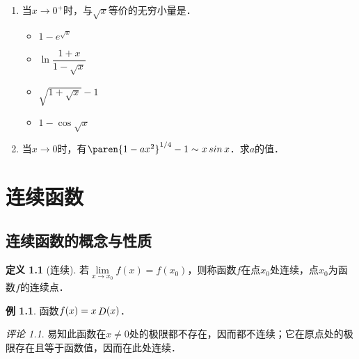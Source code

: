 \documentclass[a4paper,punct=CCT]{ctexbook}
\theoremstyle{definition}
\newtheorem{definition}{定义}
\newtheorem*{example*}{例}
\theoremstyle{remark}
\newtheorem*{remark}{评论}
\newif\ifshowsol
\begin{document}
\begin{enumerate}
\item 当\(x \to 0^+\)时，与\(\sqrt x\)等价的无穷小量是\uline{\makebox[6em]{}}．
  \begin{itemize}
    \renewcommand{\labelitemi}{\faCircleThin}
  \item \(1 - e^{\sqrt x}\)
    \ifshowsol
  \item[\faCircle]
    \else
  \item
    \fi
    \(\ln \dfrac{1+x}{1-\sqrt x}\)\rule[-2ex]{0ex}{5ex}
  \item \(\sqrt{1 + \sqrt x} - 1\)
  \item \(1 - \cos\sqrt x\)
  \end{itemize}

  \ifshowsol
  实际上，有
  \begin{equation*}
    1 - e^{\sqrt x} \sim -\sqrt x, \quad
    \ln \dfrac{1+x}{1-\sqrt x} \sim \sqrt x, \quad
    \sqrt{1 + \sqrt x} - 1 \sim \frac{\sqrt x}{2}, \quad
    1 - \cos\sqrt x \sim \frac x2.
  \end{equation*}
  \fi

\item 当\(x \to 0\)时，有\(\paren{1-ax^2}^{1/4} - 1 \sim x \sin x\)．求\(a\)的值．

  \ifshowsol
  因为\(x \sin x \sim x^2\)和\(\paren{1-ax^2}^{1/4} - 1 \sim -ax^2/4\)，所以有\(a = 4\)．
  \fi
\end{enumerate}
\fi

\chapter{连续函数\label{chap:cont}}

\section{连续函数的概念与性质}

\begin{definition}[连续]
  \label{defn:cont}
  若\(\lim\limits_{x\to x_0} f(x) = f(x_0)\)，则称函数\(f\)在点\(x_0\)处连续，点\(x_0\)为函数\(f\)的连续点．
\end{definition}

\begin{example*}
  函数\(f(x) = x \mathop{\relax D}\nolimits(x)\)．

  \begin{remark}
    易知此函数在\(x \ne 0\)处的极限都不存在，因而都不连续；它在原点处的极限存在且等于函数值，因而在此处连续．
  \end{remark}
\end{example*}
\end{document}
